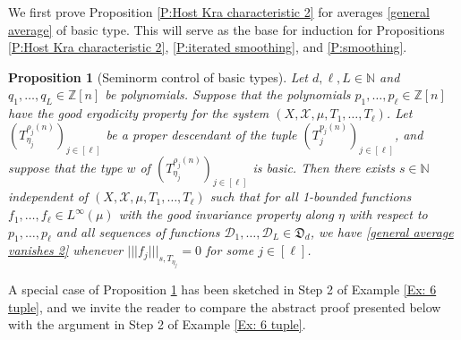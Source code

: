 \documentclass[11pt]{amsart}
\newtheorem{proposition}[lemma]{Proposition}
\theoremstyle{definition}
\newcommand{\N}{{\mathbb N}}
\newcommand{\Z}{{\mathbb Z}}
\newcommand{\CD}{{\mathcal D}}
\newcommand{\CX}{{\mathcal X}}
\newcommand{\FD}{{\mathfrak D}}
\newcommand{\nnorm}[1]{\lvert\!|\!| #1|\!|\!\rvert}
\newcommand{\brac}[1]{\mathopen{}\left( #1 \mathclose{}\right)}
\begin{document}
We first prove Proposition \ref{P:Host Kra characteristic 2} for averages \eqref{general average} of basic type. This will serve as the base for induction for Propositions \ref{P:Host Kra characteristic 2}, \ref{P:iterated smoothing}, and \ref{P:smoothing}.

\begin{proposition}[Seminorm control of basic types]\label{control of basic types}
    Let $d, \ell, L\in\N$ and $q_1, \ldots, q_L\in\Z[n]$ be polynomials. Suppose that the polynomials $p_1, \ldots, p_\ell\in \Z[n]$ have the good ergodicity property for the system $(X,\CX, \mu,T_1, \ldots, T_\ell)$. Let  $\brac{T_{\eta_{j}}^{\rho_{j}(n)}}_{j\in[\ell]}$ be a proper descendant of the tuple $\brac{T_j^{p_j(n)}}_{j\in[\ell]}$, and suppose that the type $w$ of $\brac{T_{\eta_{j}}^{\rho_{j}(n)}}_{j\in[\ell]}$ is basic.
    Then there exists $s\in\N$ independent of  $(X,\CX, \mu,T_1, \ldots, T_\ell)$ such that for all 1-bounded functions $f_1, \ldots, f_\ell\in L^\infty(\mu)$ with the good invariance property along $\eta$ with respect to $p_1, \ldots, p_\ell$ and all sequences of functions $\CD_{1}, \ldots, \CD_L\in\FD_d$, we have \eqref{general average vanishes 2}	whenever $\nnorm{f_j}_{s, T_{\eta_j}} = 0$ for some $j\in[\ell]$.
\end{proposition}
A special case of Proposition \ref{control of basic types} has been sketched in Step 2 of Example \ref{Ex: 6 tuple}, and we invite the reader to compare the abstract proof presented below with the argument in Step 2 of Example \ref{Ex: 6 tuple}.
\end{document}
